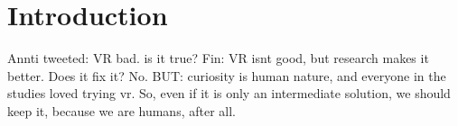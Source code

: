 %
\chapter{Introduction}
\label{sec:intro}

Annti tweeted: VR bad. is it true?
Fin: VR isnt good, but research makes it better. Does it fix it? No.
BUT: curiosity is human nature, and everyone in the studies loved trying vr. So, even if
it is only an intermediate solution, we should keep it, because we are humans, after all.